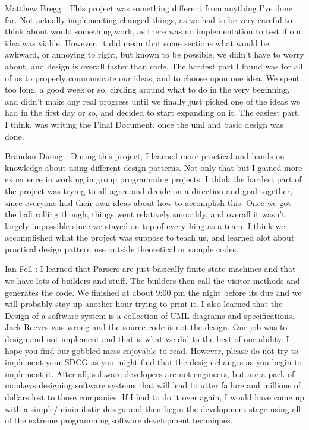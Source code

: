 \documentclass{article}
\begin{document}
\begin{list}{Learning Experience, }{}
\item Matthew Bregg : This project was something different from anything I've done far. Not actually implementing changed things, as we had to be very careful to think about would something work, as there was no implementation to test if our idea was viable. However, it did mean that some sections what would be awkward, or annoying to right, but known to be possible, we didn't have to worry about, and design is overall faster than code. The hardest part I found was for all of us to properly communicate our ideas, and to choose upon one idea. We spent too long, a good week or so, circling around what to do in the very beginning, and didn't make any real progress until we finally just picked one of the ideas we had in the first day or so, and decided to start expanding on it. The easiest part, I think, was writing the Final Document, once the uml and basic design was done. 
\item Brandon Duong : During this project, I learned more practical and hands on knowledge about using different design patterns. Not only that but I gained more experience in working in group programming projects. I think the hardest part of the project was trying to all agree and decide on a direction and goal together, since everyone had their own ideas about how to accomplish this. Once we got the ball rolling though, things went relatively smoothly, and overall it wasn't largely impossible since we stayed on top of everything as a team. I think we accomplished what the project was suppose to teach us, and learned alot about practical design pattern use outside  theoretical or sample codes.
\item Ian Fell : I learned that Parsers are just basically finite state machines and that we have lots of builders and stuff. The builders then call the visitor methods and generates the code. We finished at about 9:00 pm the night before its due and we will probably stay up another hour trying to print it. I also learned that the Design of a software system is a collection of UML diagrams and specifications. Jack Reeves was wrong and the source code is not the design. Our job was to design and not implement and that is what we did to the best of our ability. I hope you find our gobbled mess enjoyable to read. However, please do not try to implement your SDCG as you might find that the design changes as you begin to implement it. After all, software developers are not engineers, but are a pack of monkeys designing software systems that will lead to utter failure and millions of dollars lost to those companies. If I had to do it over again, I would have come up with a simple/minimilistic design and then begin the development stage using all of the extreme programming software development techniques.

\end{list}
\end{document}
